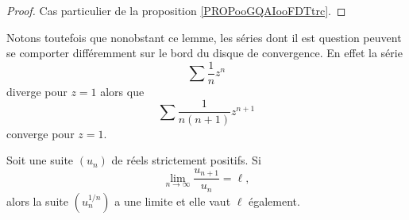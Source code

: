\begin{proof}
	Cas particulier de la proposition \ref{PROPooGQAIooFDTtrc}.
\end{proof}

Notons toutefois que nonobstant ce lemme, les séries dont il est question peuvent se comporter différemment sur le bord du disque de convergence. En effet la série
\begin{equation}
	\sum \frac{1}{ n }z^n
\end{equation}
diverge pour \( z=1\) alors que
\begin{equation}
	\sum\frac{1}{ n(n+1) }z^{n+1}
\end{equation}
converge pour \( z=1\).



\begin{lemma}     \label{LEMooNAWTooHWqKBK}
	Soit une suite \( (u_n)\) de réels strictement positifs. Si
	\begin{equation}
		\lim_{n\to \infty} \frac{ u_{n+1} }{ u_n }=\ell,
	\end{equation}
	alors la suite \( (u_n^{1/n})\) a une limite et elle vaut \( \ell\) également.
\end{lemma}

